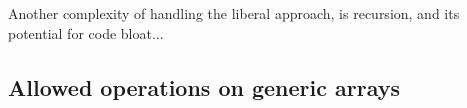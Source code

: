 Another complexity of handling the liberal approach, is recursion, and its
potential for code bloat...












\subsection{Allowed operations on generic arrays}


